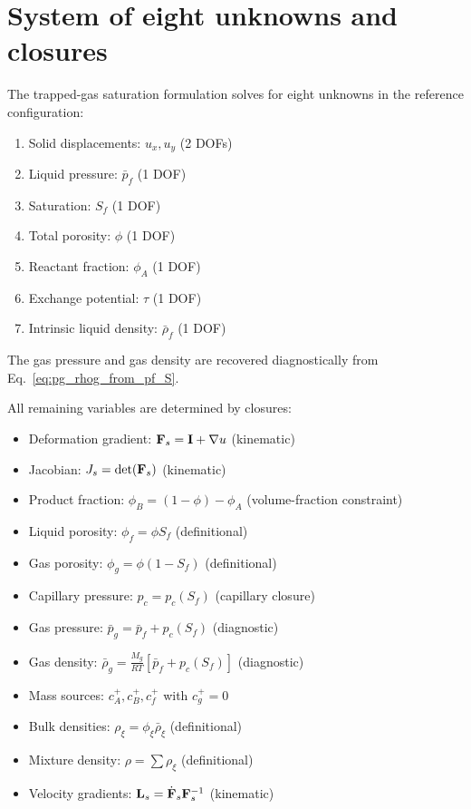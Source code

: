 \documentclass[11pt]{article}
\begin{document}
\section{System of eight unknowns and closures}
\label{sec:system_definition}

The trapped-gas saturation formulation solves for eight unknowns in the reference configuration:
\begin{enumerate}
  \item Solid displacements: $u_x, u_y$ (2 DOFs)
  \item Liquid pressure: $\bar p_f$ (1 DOF)
  \item Saturation: $S_f$ (1 DOF)
  \item Total porosity: $\phi$ (1 DOF)
  \item Reactant fraction: $\phi_A$ (1 DOF)
  \item Exchange potential: $\tau$ (1 DOF)
  \item Intrinsic liquid density: $\bar\rho_f$ (1 DOF)
\end{enumerate}
The gas pressure and gas density are recovered diagnostically from Eq.~\eqref{eq:pg_rhog_from_pf_S}.

All remaining variables are determined by closures:
\begin{itemize}
  \item Deformation gradient: $\mathbf{F}_s = \mathbf{I} + \nabla u$ (kinematic)
  \item Jacobian: $J_s = \det(\mathbf{F}_s)$ (kinematic)
  \item Product fraction: $\phi_B = (1-\phi) - \phi_A$ (volume-fraction constraint)
  \item Liquid porosity: $\phi_f = \phi S_f$ (definitional)
  \item Gas porosity: $\phi_g = \phi(1-S_f)$ (definitional)
  \item Capillary pressure: $p_c = p_c(S_f)$ (capillary closure)
  \item Gas pressure: $\bar p_g = \bar p_f + p_c(S_f)$ (diagnostic)
  \item Gas density: $\bar\rho_g = \frac{M_g}{RT}[\bar p_f + p_c(S_f)]$ (diagnostic)
  \item Mass sources: $c_A^+, c_B^+, c_f^+$ with $c_g^+=0$
  \item Bulk densities: $\rho_\xi = \phi_\xi \bar\rho_\xi$ (definitional)
  \item Mixture density: $\rho = \sum \rho_\xi$ (definitional)
  \item Velocity gradients: $\mathbf{L}_s = \dot{\mathbf{F}}_s \mathbf{F}_s^{-1}$ (kinematic)
\end{itemize}
\end{document}
